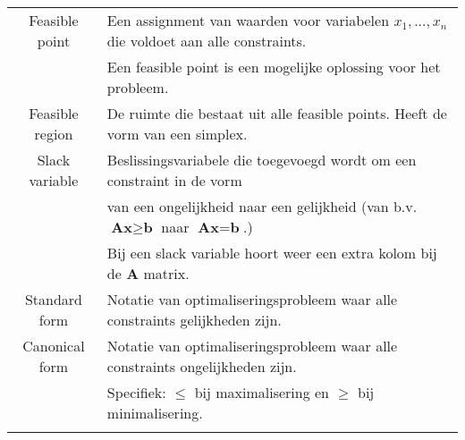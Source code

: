 \documentclass[10pt,a4paper]{article}
\begin{document}
\begin{tabular}{|c|l|}
\hline
Feasible point & Een assignment van waarden voor variabelen $x_1, ..., x_n$ die voldoet aan alle constraints. \\ 
& Een feasible point is een mogelijke oplossing voor het probleem.\\
\hline
Feasible region & De ruimte die bestaat uit alle feasible points. Heeft de vorm van een simplex. \\
\hline
Slack variable & Beslissingsvariabele die toegevoegd wordt om een constraint in de vorm \\ &van een ongelijkheid naar een gelijkheid (van b.v. $\textbf{Ax} \geq \textbf{b}$ naar $\textbf{Ax} = \textbf{b}$.)\\
& Bij een slack variable hoort weer een extra kolom bij de $\textbf{A}$ matrix. \\
\hline
Standard form & Notatie van optimaliseringsprobleem waar alle constraints gelijkheden zijn.\\
\hline
Canonical form & Notatie van optimaliseringsprobleem waar alle constraints ongelijkheden zijn.\\
 & Specifiek: $\le$ bij maximalisering en $\geq$ bij minimalisering. \\
\hline
 & \\
\hline
\end{tabular} 
\end{document}
